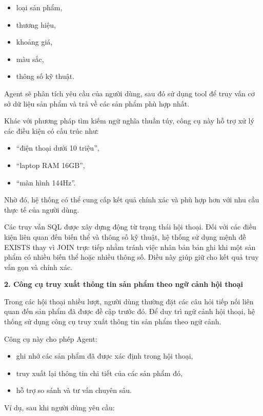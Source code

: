 \begin{itemize}
    \item loại sản phẩm,
    \item thương hiệu,
    \item khoảng giá,
    \item màu sắc,
    \item thông số kỹ thuật.
\end{itemize}

Agent sẽ phân tích yêu cầu của người dùng, sau đó sử dụng tool để truy vấn cơ sở dữ liệu sản phẩm và trả về các sản phẩm phù hợp nhất.

Khác với phương pháp tìm kiếm ngữ nghĩa thuần túy, công cụ này hỗ trợ xử lý các điều kiện có cấu trúc như:

\begin{itemize}
    \item ``điện thoại dưới 10 triệu'',
    \item ``laptop RAM 16GB'',
    \item ``màn hình 144Hz''.
\end{itemize}

Nhờ đó, hệ thống có thể cung cấp kết quả chính xác và phù hợp hơn với nhu cầu thực tế của người dùng.

Các truy vấn SQL được xây dựng động từ trạng thái hội thoại. Đối với các điều kiện liên quan đến biến thể và thông số kỹ thuật, hệ thống sử dụng mệnh đề EXISTS thay vì JOIN trực tiếp nhằm tránh việc nhân bản bản ghi khi một sản phẩm có nhiều biến thể hoặc nhiều thông số. Điều này giúp giữ cho kết quả truy vấn gọn và chính xác.

\textbf{2. Công cụ truy xuất thông tin sản phẩm theo ngữ cảnh hội thoại}

Trong các hội thoại nhiều lượt, người dùng thường đặt các câu hỏi tiếp nối liên quan đến sản phẩm đã được đề cập trước đó. Để duy trì ngữ cảnh hội thoại, hệ thống sử dụng công cụ truy xuất thông tin sản phẩm theo ngữ cảnh.

Công cụ này cho phép Agent:

\begin{itemize}
    \item ghi nhớ các sản phẩm đã được xác định trong hội thoại,
    \item truy xuất lại thông tin chi tiết của các sản phẩm đó,
    \item hỗ trợ so sánh và tư vấn chuyên sâu.
\end{itemize}

Ví dụ, sau khi người dùng yêu cầu:

